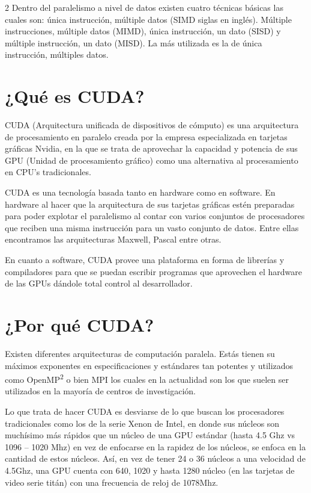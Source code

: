 \documentclass[12pt,spanish,Letterpaper,openany]{book}
\begin{document}
\begin {multicols}{2}
Dentro del paralelismo a nivel de datos existen cuatro técnicas básicas las cuales son: única instrucción, múltiple datos (SIMD siglas en inglés). Múltiple instrucciones, múltiple datos (MIMD), única instrucción, un dato (SISD) y múltiple instrucción, un dato (MISD). La más utilizada es la de única instrucción, múltiples datos.

\hypertarget{quuxe9-es-cuda}{%
\section{¿Qué es CUDA?}\label{quuxe9-es-cuda}}

CUDA (Arquitectura unificada de dispositivos de cómputo) es una arquitectura de procesamiento en paralelo creada por la empresa especializada en tarjetas gráficas Nvidia, en la que se trata de aprovechar la capacidad y potencia de sus GPU (Unidad de procesamiento gráfico) como una alternativa al procesamiento en CPU's tradicionales.

CUDA es una tecnología basada tanto en hardware como en software. En hardware al hacer que la arquitectura de sus tarjetas gráficas estén preparadas para poder explotar el paralelismo al contar con varios conjuntos de procesadores que reciben una misma instrucción para un vasto conjunto de datos. Entre ellas encontramos las arquitecturas Maxwell, Pascal entre otras.

En cuanto a software, CUDA provee una plataforma en forma de librerías y compiladores para que se puedan escribir programas que aprovechen el hardware de las GPUs dándole total control al desarrollador.

\hypertarget{por-quuxe9-cuda}{%
\section{¿Por qué CUDA?}\label{por-quuxe9-cuda}}

Existen diferentes arquitecturas de computación paralela. Estás tienen su máximos exponentes en especificaciones y estándares tan potentes y utilizados como OpenMP\textsuperscript{2} o bien MPI los cuales en la actualidad son los que suelen ser utilizados en la mayoría de centros de investigación.

Lo que trata de hacer CUDA es desviarse de lo que buscan los procesadores tradicionales como los de la serie Xenon de Intel, en donde sus núcleos son muchísimo más rápidos que un núcleo de una GPU estándar (hasta 4.5 Ghz vs 1096 -- 1020 Mhz) en vez de enfocarse en la rapidez de los núcleos, se enfoca en la cantidad de estos núcleos. Así, en vez de tener 24 o 36 núcleos a una velocidad de 4.5Ghz, una GPU cuenta con 640, 1020 y hasta 1280 núcleo (en las tarjetas de video serie titán) con una frecuencia de reloj de 1078Mhz.


\end{multicols}
\end{document}
